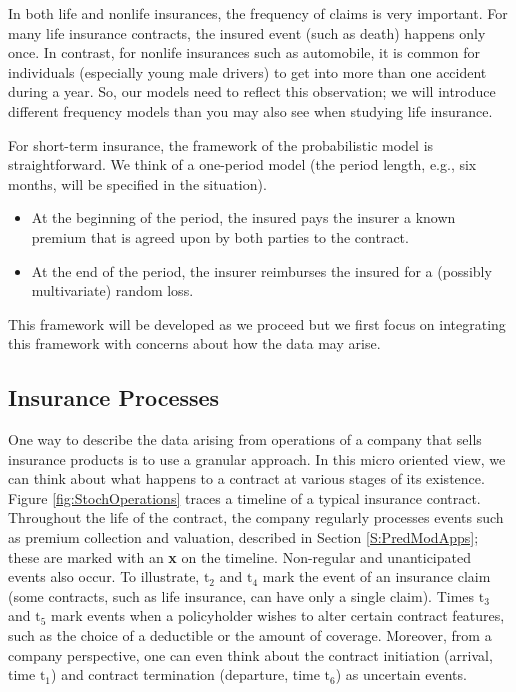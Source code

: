 \documentclass[]{book}
\theoremstyle{definition}
\theoremstyle{definition}
\theoremstyle{definition}
\theoremstyle{remark}
\begin{document}
In both life and nonlife insurances, the frequency of claims is very
important. For many life insurance contracts, the insured event (such as
death) happens only once. In contrast, for nonlife insurances such as
automobile, it is common for individuals (especially young male drivers)
to get into more than one accident during a year. So, our models need to
reflect this observation; we will introduce different frequency models
than you may also see when studying life insurance.

For short-term insurance, the framework of the probabilistic model is
straightforward. We think of a one-period model (the period length,
e.g., six months, will be specified in the situation).

\begin{itemize}
\item
  At the beginning of the period, the insured pays the insurer a known
  premium that is agreed upon by both parties to the contract.
\item
  At the end of the period, the insurer reimburses the insured for a
  (possibly multivariate) random loss.
\end{itemize}

This framework will be developed as we proceed but we first focus on
integrating this framework with concerns about how the data may arise.

\subsection{Insurance Processes}\label{S:InsProcesses}

One way to describe the data arising from operations of a company that
sells insurance products is to use a granular approach. In this micro
oriented view, we can think about what happens to a contract at various
stages of its existence. Figure \ref{fig:StochOperations} traces a
timeline of a typical insurance contract. Throughout the life of the
contract, the company regularly processes events such as premium
collection and valuation, described in Section \ref{S:PredModApps};
these are marked with an \textbf{x} on the timeline. Non-regular and
unanticipated events also occur. To illustrate, \(\mathrm{t}_2\) and
\(\mathrm{t}_4\) mark the event of an insurance claim (some contracts,
such as life insurance, can have only a single claim). Times
\(\mathrm{t}_3\) and \(\mathrm{t}_5\) mark events when a policyholder
wishes to alter certain contract features, such as the choice of a
deductible or the amount of coverage. Moreover, from a company
perspective, one can even think about the contract initiation (arrival,
time \(\mathrm{t}_1\)) and contract termination (departure, time
\(\mathrm{t}_6\)) as uncertain events.
\end{document}
